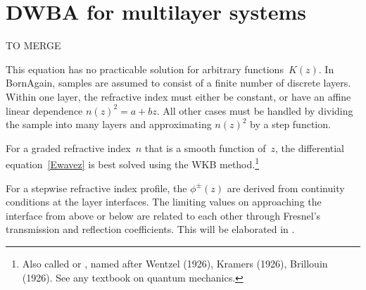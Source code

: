 

\chapter{DWBA for multilayer systems}  \label{sec:Multilayers}


%

TO MERGE

%
%
%
This equation has no practicable solution for arbitrary functions~$K(z)$.
In BornAgain, samples are assumed to consist of a finite number of discrete layers.
%
%
Within one layer, the refractive index must either be constant,
or have an affine linear dependence $n(z)^2=a+bz$.
All other cases must be handled by dividing the sample into many layers
and approximating $n(z)^2$ by a step function.


For a graded refractive index~$n$
 that is a smooth function of~$z$,
the differential equation~\cref{Ewavez} is best solved
using the WKB method.\footnote
{Also called  or
,
named after Wentzel (1926), Kramers (1926), Brillouin (1926).
See any textbook on quantum mechanics.}
%
%
%

For a stepwise refractive index profile,
the $\phi^\pm(z)$ are derived from continuity conditions at the layer interfaces.
The limiting values on approaching the interface from above or below
are related to each other through Fresnel's
transmission and reflection coefficients.
%
This will be elaborated in .

